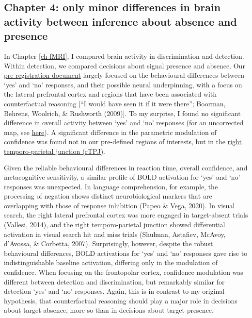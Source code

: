 \documentclass[12pt,twoside]{reedthesis}
\begin{document}
\hypertarget{chapter-4-only-minor-differences-in-brain-activity-between-inference-about-absence-and-presence}{%
\subsection*{Chapter 4: only minor differences in brain activity between inference about absence and presence}\label{chapter-4-only-minor-differences-in-brain-activity-between-inference-about-absence-and-presence}}

In Chapter \ref{ch-fMRI}, I compared brain activity in discrimination and detection. Within detection, we compared decisions about signal presence and absence. Our \href{https://github.com/matanmazor/detectionVsDiscrimination_fMRI/blob/master/protocol\%20folder/docs/Confidence\%20in\%20Detection\%20and\%20Discrimination.pdf}{pre-registration document} largely focused on the behavioural differences between `yes' and `no' responses, and their possible neural underpinning, with a focus on the lateral prefrontal cortex and regions that have been associated with counterfactual reasoning {[}``I would have seen it if it were there''; Boorman, Behrens, Woolrich, \& Rushworth (2009){]}. To my surprise, I found no significant difference in overall activity between `yes' and `no' responses (for an uncorrected map, see \href{https://identifiers.org/neurovault.image:305384}{here}). A significant difference in the parametric modulation of confidence was found not in our pre-defined regions of interests, but in the \href{https://identifiers.org/neurovault.image:305379}{right temporo-parietal junction (rTPJ)}.

Given the reliable behavioural differences in reaction time, overall confidence, and metacognitive sensitivity, a similar profile of BOLD activation for `yes' and `no' responses was unexpected. In language comprehension, for example, the processing of negation shows distinct neurobiological markers that are overlapping with those of response inhibition (Papeo \& Vega, 2020). In visual search, the right lateral prefrontal cortex was more engaged in target-absent trials (Vallesi, 2014), and the right temporo-parietal junction showed differential activation in visual search hit and miss trials (Shulman, Astafiev, McAvoy, d'Avossa, \& Corbetta, 2007). Surprisingly, however, despite the robust behavioural differences, BOLD activations for `yes' and `no' responses gave rise to indistinguishable baseline activation, differing only in the modulation of confidence. When focusing on the frontopolar cortex, confidence modulation was different between detection and discrimination, but remarkably similar for detection `yes' and `no' responses. Again, this is in contrast to my original hypothesis, that counterfactual reasoning should play a major role in decisions about target absence, more so than in decisions about target presence.
\end{document}
